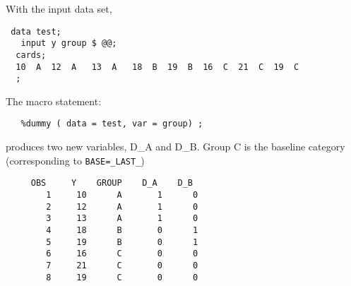 With the input data set,

\begin{verbatim}
 data test;
   input y group $ @@;
  cards;
  10  A  12  A   13  A   18  B  19  B  16  C  21  C  19  C  
  ;
\end{verbatim}


The macro statement:

\begin{verbatim}
   %dummy ( data = test, var = group) ;
\end{verbatim}


produces two new variables, D\_A and D\_B.  Group C is the baseline
category (corresponding to \texttt{BASE=\_LAST\_})

\begin{verbatim}
     OBS     Y    GROUP    D_A    D_B
        1     10      A       1      0
        2     12      A       1      0
        3     13      A       1      0
        4     18      B       0      1
        5     19      B       0      1
        6     16      C       0      0
        7     21      C       0      0
        8     19      C       0      0
\end{verbatim}
